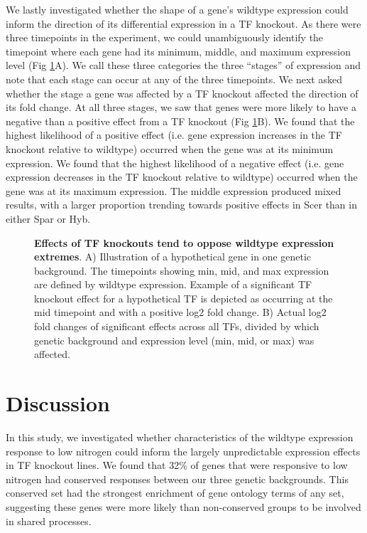 We lastly investigated whether the shape of a gene's wildtype expression could inform the direction of its differential expression in a TF knockout. As there were three timepoints in the experiment, we could unambiguously identify the timepoint where each gene had its minimum, middle, and maximum expression level (Fig \ref{fig:variance}A). We call these three categories the three ``stages'' of expression and note that each stage can occur at any of the three timepoints. We next asked whether the stage a gene was affected by a TF knockout affected the direction of its fold change. At all three stages, we saw that genes were more likely to have a negative than a positive effect from a TF knockout (Fig \ref{fig:variance}B). We found that the highest likelihood of a positive effect (i.e. gene expression increases in the TF knockout relative to wildtype) occurred when the gene was at its minimum expression. We found that the highest likelihood of a negative effect (i.e. gene expression decreases in the TF knockout relative to wildtype) occurred when the gene was at its maximum expression. The middle expression produced mixed results, with a larger proportion trending towards positive effects in Scer than in either Spar or Hyb.

\begin{figure}
     \caption{\textbf{Effects of TF knockouts tend to oppose wildtype expression extremes}. A) Illustration of a hypothetical gene in one genetic background. The timepoints showing min, mid, and max expression are defined by wildtype expression. Example of a significant TF knockout effect for a hypothetical TF is depicted as occurring at the mid timepoint and with a positive log2 fold change. B) Actual log2 fold changes of significant effects across all TFs, divided by which genetic background and expression level (min, mid, or max) was affected.}
    \label{fig:variance}
\end{figure}

\section{Discussion}

In this study, we investigated whether characteristics of the wildtype expression response to low nitrogen could inform the largely unpredictable expression effects in TF knockout lines. We found that 32\% of genes that were responsive to low nitrogen had conserved responses between our three genetic backgrounds. This conserved set had the strongest enrichment of gene ontology terms of any set, suggesting these genes were more likely than non-conserved groups to be involved in shared processes.

